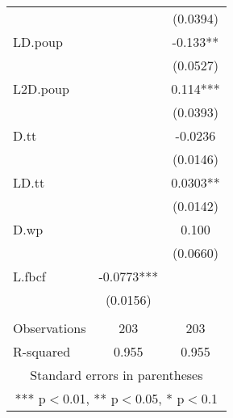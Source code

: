 \begin{tabular}{lcc}
 &  & (0.0394) \\
LD.poup &  & -0.133** \\
 &  & (0.0527) \\
L2D.poup &  & 0.114*** \\
 &  & (0.0393) \\
D.tt &  & -0.0236 \\
 &  & (0.0146) \\
LD.tt &  & 0.0303** \\
 &  & (0.0142) \\
D.wp &  & 0.100 \\
 &  & (0.0660) \\
L.fbcf & -0.0773*** &  \\
 & (0.0156) &  \\
 &  &  \\
Observations & 203 & 203 \\
 R-squared & 0.955 & 0.955 \\ \hline
\multicolumn{3}{c}{ Standard errors in parentheses} \\
\multicolumn{3}{c}{ *** p$<$0.01, ** p$<$0.05, * p$<$0.1} \\
\end{tabular}
